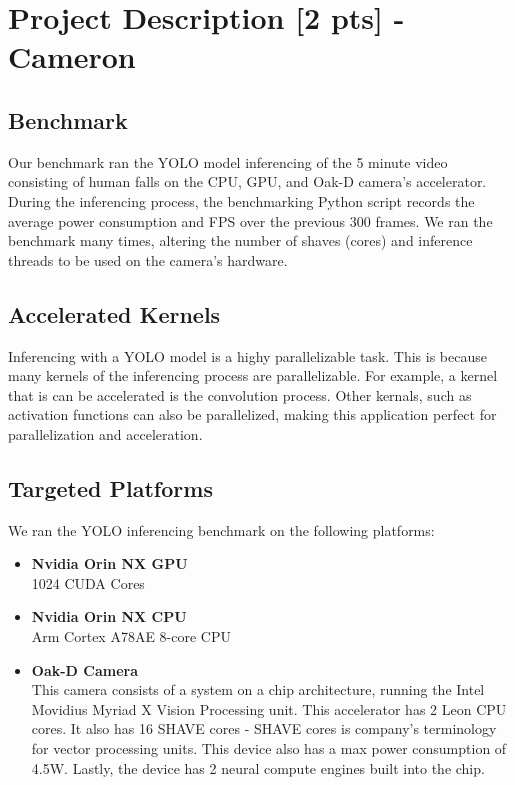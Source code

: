 \documentclass[sigconf,authorversion,nonacm]{acmart}
\begin{document}
\section{Project Description  {\small {[2 pts]}} - Cameron}

\subsection{Benchmark}
Our benchmark ran the YOLO model inferencing of the 5 minute video consisting of human falls on the CPU, GPU, and Oak-D camera's accelerator. During the inferencing process, the benchmarking Python script records the average power consumption and FPS over the previous 300 frames. We ran the benchmark many times, altering the number of shaves (cores) and inference threads to be used on the camera's hardware.

\subsection{Accelerated Kernels}
Inferencing with a YOLO model is a highy parallelizable task. This is because many kernels of the inferencing process are parallelizable. For example, a kernel that is can be accelerated is the convolution process. Other kernals, such as activation functions can also be parallelized, making this application perfect for parallelization and acceleration.

\subsection{Targeted Platforms}
We ran the YOLO inferencing benchmark on the following platforms:
\begin{itemize}
    \item \textbf{Nvidia Orin NX GPU} \\ 1024 CUDA Cores
    \item \textbf{Nvidia Orin NX CPU} \\ Arm Cortex A78AE 8-core CPU
    \item \textbf{Oak-D Camera} \\ This camera consists of a system on a chip architecture, running the Intel Movidius Myriad X Vision Processing unit. This accelerator has 2 Leon CPU cores. It also has 16 SHAVE cores - SHAVE cores is company's terminology for vector processing units. This device also has a max power consumption of 4.5W. Lastly, the device has 2 neural compute engines built into the chip.
\end{itemize}
\end{document}
